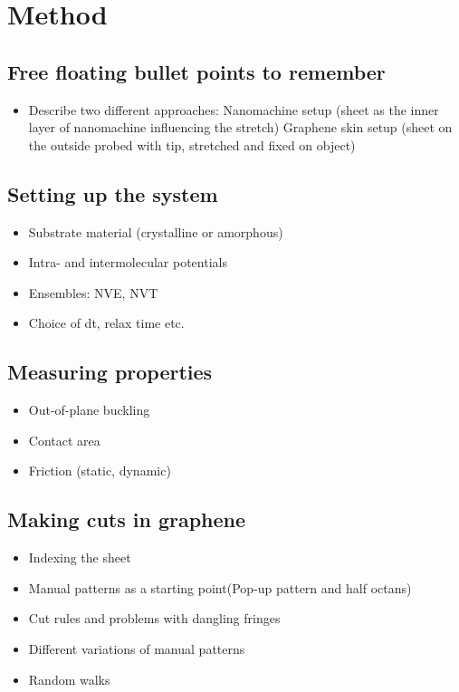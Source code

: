\newpage
\chapter*{Method}

\section{Free floating bullet points to remember}
\begin{itemize}
  \item Describe two different approaches:
  \subitem Nanomachine setup (sheet as the inner layer of nanomachine influencing the stretch)
  \subitem Graphene skin setup (sheet on the outside probed with tip, stretched and fixed on object)
\end{itemize}


\section{Setting up the system}
\begin{itemize}
  \item Substrate material (crystalline or amorphous)
  \item Intra- and intermolecular potentials
  \item Ensembles: NVE, NVT
  \item Choice of dt, relax time etc.  
\end{itemize}
\section{Measuring properties}
\begin{itemize}
  \item Out-of-plane buckling
  \item Contact area
  \item Friction (static, dynamic)
\end{itemize}


\section{Making cuts in graphene}
\begin{itemize}
  \item Indexing the sheet
  \item  Manual patterns as a starting point(Pop-up pattern and half octans) 
  \item Cut rules and problems with dangling fringes
  \item Different variations of manual patterns 
  \item Random walks 
\end{itemize}

